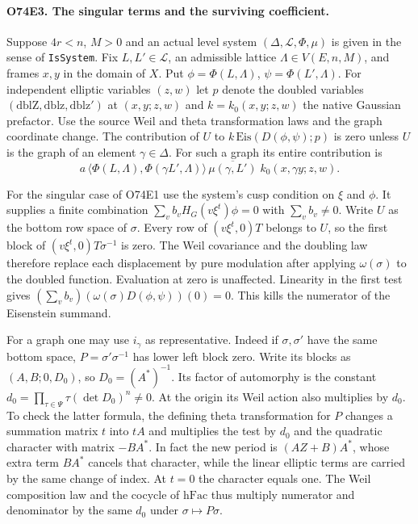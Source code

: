 \paragraph{O74E3. The singular terms and the surviving coefficient.}
Suppose $4r<n$, $M>0$ and an actual level system
$(\Delta,\mathcal L,\Phi,\mu)$ is given in the sense of
\texttt{IsSystem}. Fix $L,L'\in\mathcal L$, an admissible lattice
$\Lambda\in V(E,n,M)$, and frames $x,y$ in the domain of $X$.
Put $\phi=\Phi(L,\Lambda)$, $\psi=\Phi(L',\Lambda)$.
For independent elliptic variables $(z,w)$ let $p$ denote the
doubled variables $(\mathrm{dblZ},\mathrm{dblz},\mathrm{dblz}')$
at $(x,y;z,w)$ and $k=k_0(x,y;z,w)$ the native Gaussian prefactor.
Use the source Weil and theta transformation laws and the graph
coordinate change. The contribution of $U$ to $k\,\mathrm{Eis}(D(\phi,\psi);p)$
is zero unless $U$ is the graph of an element $\gamma\in\Delta$.
For such a graph its entire contribution is
\[
 a\,\langle\Phi(L,\Lambda),\Phi(\gamma L',\Lambda)\rangle
       \,\overline{\mu(\gamma,L')}\; k_0(x,\gamma y;z,w).
\]

For the singular case of O74E1 use the system's cusp condition on
$\xi$ and $\phi$. It supplies a finite combination
$\sum_v b_v H_G(v\xi^t)\phi=0$ with $\sum_v b_v\ne0$.
Write $U$ as the bottom row space of $\sigma$. Every row of
$(v\xi^t,0)T$ belongs to $U$, so the first block of
$(v\xi^t,0)T\sigma^{-1}$ is zero. The Weil covariance and the
doubling law therefore replace each displacement by pure modulation
after applying $\omega(\sigma)$ to the doubled function. Evaluation
at zero is unaffected. Linearity in the first test gives
$(\sum_v b_v)(\omega(\sigma)D(\phi,\psi))(0)=0$.
This kills the numerator of the Eisenstein summand.

For a graph one may use $i_\gamma$ as representative. Indeed if
$\sigma,\sigma'$ have the same bottom space, $P=\sigma'\sigma^{-1}$
has lower left block zero. Write its blocks as $(A,B;0,D_0)$, so
$D_0=(A^*)^{-1}$. Its factor of automorphy is the constant
$d_0=\prod_{\tau\in\Psi}\tau(\det D_0)^n\ne0$. At the origin its
Weil action also multiplies by $d_0$. To check the latter formula,
the defining theta transformation for $P$ changes a summation matrix
$t$ into $tA$ and multiplies the test by $d_0$ and the quadratic
character with matrix $-BA^*$. In fact the new period is
$(AZ+B)A^*$, whose extra term $BA^*$ cancels that character, while
the linear elliptic terms are carried by the same change of index.
At $t=0$ the character equals one. The Weil composition law and the
cocycle of $\mathrm{hFac}$ thus multiply numerator and denominator
by the same $d_0$ under $\sigma\mapsto P\sigma$.

